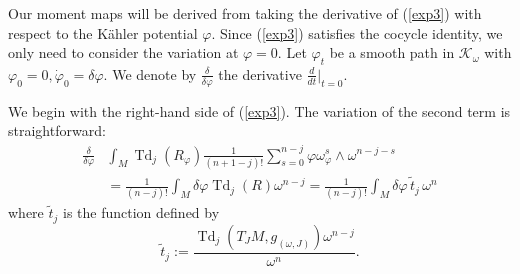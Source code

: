 \documentclass[12pt,reqno,a4paper]{amsart}
\numberwithin{equation}{section}
\DeclareMathOperator{\Td}{Td}
\theoremstyle{definition}
\theoremstyle{remark}
\begin{document}
Our moment maps will be derived from taking the derivative of (\ref{exp3}) with respect to the K\"ahler potential $\varphi$. Since (\ref{exp3}) satisfies the cocycle identity, we only need to consider the variation at $\varphi=0$. Let $\varphi_t$ be a smooth path in $\mathcal{K}_\omega$ with $\varphi_0=0, \dot{\varphi}_0=\delta \varphi$. We denote by $\frac{\delta}{\delta\varphi}$ the derivative $\frac{d}{dt}|_{t=0}$. 

We begin with the right-hand side of (\ref{exp3}). The variation of the second term is straightforward:
\begin{align*}
\frac{\delta}{\delta\varphi} &\int_M\Td_{j}(R_\varphi)\frac{1}{(n+1-j)!}\sum^{n-j}_{s=0}\varphi \omega_{\varphi}^s\wedge \omega^{n-j-s}\\
&=\frac{1}{(n-j)!} \int_M \delta\varphi\Td_{j}(R)\omega^{n-j}=\frac{1}{(n-j)!} \int_M \delta\varphi \,\widetilde{t}_j\, \omega^{n}
\end{align*}
where $\widetilde{t}_j$ is the function defined by
\begin{equation*}
\widetilde{t}_j:=\frac{\Td_j(T_J M,g_{(\omega,J)})\omega^{n-j}}{\omega^n}.
\end{equation*}
\end{document}
